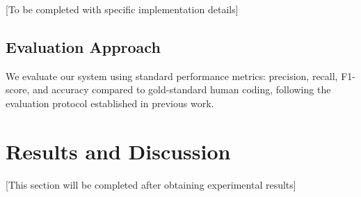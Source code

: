 \documentclass[
  authoryear,
  preprint]{elsarticle}
\begin{document}
{[}To be completed with specific implementation details{]}

\subsection{Evaluation Approach}\label{evaluation-approach}

We evaluate our system using standard performance metrics: precision,
recall, F1-score, and accuracy compared to gold-standard human coding,
following the evaluation protocol established in previous work.

\section{Results and Discussion}\label{results-and-discussion}

{[}This section will be completed after obtaining experimental
results{]}


\renewcommand\refname{References}
  
\end{document}
